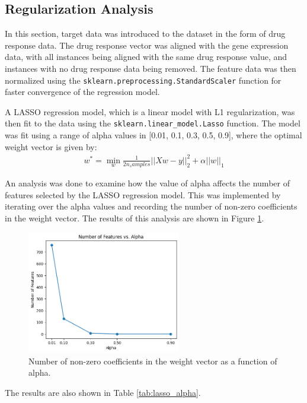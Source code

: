 \documentclass[12pt]{article}
\begin{document}
\subsection{Regularization Analysis}
In this section, target data was introduced to the dataset in the form of drug response data. The drug response vector was aligned with the gene expression data, with all instances being aligned with the same drug response value, and instances with no drug response data being removed. The feature data was then normalized using the \verb|sklearn.preprocessing.StandardScaler| function for faster convergence of the regression model.

A LASSO regression model, which is a linear model with L1 regularization, was then fit to the data using the \verb|sklearn.linear_model.Lasso| function. The model was fit using a range of alpha values in [0.01, 0.1, 0.3, 0.5, 0.9], where the optimal weight vector is given by:
\begin{align*}
    w^* = \min_w \frac{1}{2n_samples}||Xw-y||_2^2 + \alpha||w||_1
\end{align*}

An analysis was done to examine how the value of alpha affects the number of features selected by the LASSO regression model. This was implemented by iterating over the alpha values and recording the number of non-zero coefficients in the weight vector. The results of this analysis are shown in Figure \ref{fig:lasso_alpha}.

\begin{figure}[H]
    \centering
    \includegraphics[width=0.6\textwidth]{Images/regularization.png}
    \caption{Number of non-zero coefficients in the weight vector as a function of alpha.}
    \label{fig:lasso_alpha}
\end{figure}

The results are also shown in Table \ref{tab:lasso_alpha}.
\end{document}
